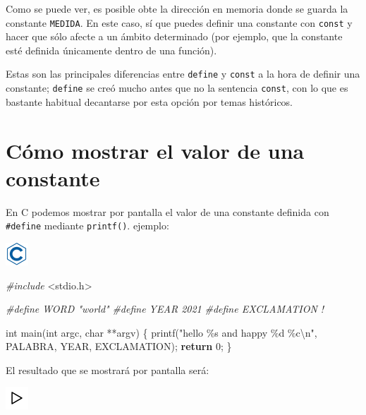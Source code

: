 \documentclass[
]{book}
\newenvironment{Shaded}{\begin{snugshade}}{\end{snugshade}}
\newcommand{\ControlFlowTok}[1]{\textcolor[rgb]{0.13,0.29,0.53}{\textbf{#1}}}
\newcommand{\DataTypeTok}[1]{\textcolor[rgb]{0.13,0.29,0.53}{#1}}
\newcommand{\DecValTok}[1]{\textcolor[rgb]{0.00,0.00,0.81}{#1}}
\newcommand{\ImportTok}[1]{#1}
\newcommand{\NormalTok}[1]{#1}
\newcommand{\PreprocessorTok}[1]{\textcolor[rgb]{0.56,0.35,0.01}{\textit{#1}}}
\newcommand{\SpecialCharTok}[1]{\textcolor[rgb]{0.00,0.00,0.00}{#1}}
\newcommand{\StringTok}[1]{\textcolor[rgb]{0.31,0.60,0.02}{#1}}
\begin{document}
Como se puede ver, es posible obte la dirección en memoria donde se guarda la constante \texttt{MEDIDA}. En este caso, sí que puedes definir una constante con \texttt{const} y hacer que sólo afecte a un ámbito determinado (por ejemplo, que la constante esté definida únicamente dentro de una función).

Estas son las principales diferencias entre \texttt{define} y \texttt{const} a la hora de definir una constante; \texttt{define} se creó mucho antes que no la sentencia \texttt{const}, con lo que es bastante habitual decantarse por esta opción por temas históricos.

\hypertarget{cuxf3mo-mostrar-el-valor-de-una-constante}{%
\section{Cómo mostrar el valor de una constante}\label{cuxf3mo-mostrar-el-valor-de-una-constante}}

En C podemos mostrar por pantalla el valor de una constante definida con \texttt{\#define} mediante \texttt{printf()}. ejemplo:

\includegraphics{./img/c.png}

\begin{Shaded}
\begin{Highlighting}[]
\PreprocessorTok{\#include }\ImportTok{\textless{}stdio.h\textgreater{}}

\PreprocessorTok{\#define WORD "world"}
\PreprocessorTok{\#define YEAR 2021}
\PreprocessorTok{\#define EXCLAMATION \textquotesingle{}!\textquotesingle{}}

\DataTypeTok{int}\NormalTok{ main(}\DataTypeTok{int}\NormalTok{ argc, }\DataTypeTok{char}\NormalTok{ **argv) \{}
\NormalTok{    printf(}\StringTok{"hello \%s and happy \%d \%c}\SpecialCharTok{\textbackslash{}n}\StringTok{"}\NormalTok{, PALABRA, YEAR, EXCLAMATION);}
    \ControlFlowTok{return} \DecValTok{0}\NormalTok{;}
\NormalTok{\}}
\end{Highlighting}
\end{Shaded}

El resultado que se mostrará por pantalla será:

\includegraphics{./img/play.png}
\end{document}
